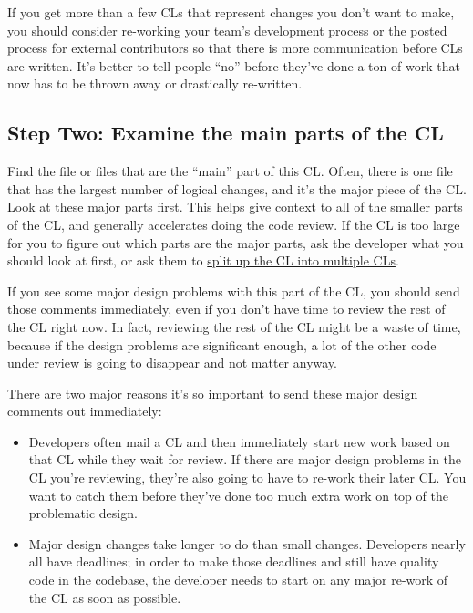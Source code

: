 \documentclass[
]{article}
\providecommand{\tightlist}{%
  \setlength{\itemsep}{0pt}\setlength{\parskip}{0pt}}
\begin{document}
If you get more than a few CLs that represent changes you don't want to
make, you should consider re-working your team's development process or
the posted process for external contributors so that there is more
communication before CLs are written. It's better to tell people ``no''
before they've done a ton of work that now has to be thrown away or
drastically re-written.

\subsection{Step Two: Examine the main parts of the CL}\label{step_two}

Find the file or files that are the ``main'' part of this CL. Often,
there is one file that has the largest number of logical changes, and
it's the major piece of the CL. Look at these major parts first. This
helps give context to all of the smaller parts of the CL, and generally
accelerates doing the code review. If the CL is too large for you to
figure out which parts are the major parts, ask the developer what you
should look at first, or ask them to
\href{../developer/small-cls.md}{split up the CL into multiple CLs}.

If you see some major design problems with this part of the CL, you
should send those comments immediately, even if you don't have time to
review the rest of the CL right now. In fact, reviewing the rest of the
CL might be a waste of time, because if the design problems are
significant enough, a lot of the other code under review is going to
disappear and not matter anyway.

There are two major reasons it's so important to send these major design
comments out immediately:

\begin{itemize}
\tightlist
\item
  Developers often mail a CL and then immediately start new work based
  on that CL while they wait for review. If there are major design
  problems in the CL you're reviewing, they're also going to have to
  re-work their later CL. You want to catch them before they've done too
  much extra work on top of the problematic design.
\item
  Major design changes take longer to do than small changes. Developers
  nearly all have deadlines; in order to make those deadlines and still
  have quality code in the codebase, the developer needs to start on any
  major re-work of the CL as soon as possible.
\end{itemize}
\end{document}
